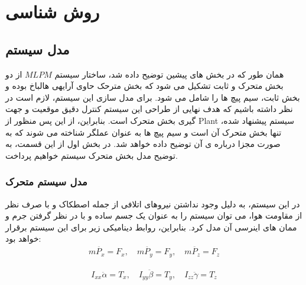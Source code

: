 \chapter{روش شناسی}

\section{مدل سیستم}

همان طور که در بخش های پیشین توضیح داده شد، ساختار سیستم $MLPM$ از دو بخش متحرک و ثابت تشکیل می شود که بخش مترحک حاوی آرایهی هالباخ بوده و بخش ثابت، سیم پیچ ها را شامل می شود. برای مدل سازی این سیستم، لازم است در نظر داشته باشیم که هدف نهایی از طراحی این سیستم کنترل دقیق موقعیت و جهت گیری بخش متحرک است. بنابراین، از این پس منظور از Plant سیستم پیشنهاد شده، تنها بخش متحرک آن است و سیم پیچ ها به عنوان عملگر شناخته می شوند که به صورت مجزا درباره ی آن توضیح داده خواهد شد.
در بخش اول از این قسمت، به توضیح مدل بخش متحرک سیستم خواهیم پرداخت.
\subsection{مدل سیستم متحرک}
در این سیستم، به دلیل وجود نداشتن نیروهای اتلافی از جمله اصطکاک و با صرف نظر از مقاومت هوا، می توان سیستم را به عنوان یک جسم ساده و با در نظر گرفتن جرم و ممان های اینرسی آن مدل کرد. بنابراین، روابط دینامیکی زیر برای این سیستم برقرار خواهد بود:
\begin{align}
	m \ddot{P_x} = F_x, \quad m \ddot{P_y} = F_y, \quad m \ddot{P_z} = F_z
\end{align}


\begin{align}
	I_{xx} \ddot{\alpha} = T_x, \quad I_{yy} \ddot{\beta} = T_y, \quad I_{zz} \ddot{\gamma} = T_z
\end{align}


